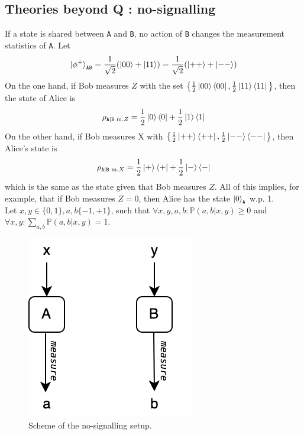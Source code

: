 \documentclass{article}
\begin{document}
\subsection{Theories beyond Q : no-signalling}
If a state is shared between \texttt{A} and \texttt{B}, no action of \texttt{B}
changes the measurement statistics of \texttt{A}. Let
\begin{equation}
    \ket{\phi^+}_{\texttt{AB}}
        = \frac{1}{\sqrt2}(\ket{00} + \ket{11})
        = \frac{1}{\sqrt2}(\ket{++} + \ket{--})
\end{equation}
On the one hand, if Bob measures $Z$ with the set
$\big\{\frac{1}{2}\ket{00}\bra{00},\frac{1}{2}\ket{11}\bra{11} \big\}$, then the
state of Alice is
\begin{equation}
    \rho_{\texttt{A}|\texttt{B}\text{ m.}Z}
        = \frac{1}{2} \ket{0}\bra{0} + \frac{1}{2}\ket{1}\bra{1}
\end{equation}On the other hand, if
Bob measures X with
$\big\{\frac{1}{2}\ket{++}\bra{++},\frac{1}{2}\ket{--}\bra{--} \big\}$, then
Alice's state is
\begin{equation}
    \rho_{\texttt{A}|\texttt{B}\text{ m.}X}
        = \frac{1}{2}\ket{+}\bra{+} + \frac{1}{2}\ket{-}\bra{-}
\end{equation}
which is the same as the state given that Bob measures $Z$. All of this implies,
for example, that if Bob measures $Z = 0$, then Alice has the state
$\ket{0}_\texttt{A}$ w.p. 1. \newline \\\noindent Let $x, y\in \{0,1\}, a,
b\{-1, +1\}$, such that $\forall x, y, a, b : \mathbb{P}(a,b|x,y) \geq 0$ and
$\forall x, y : \sum_{a,b}\mathbb{P}(a,b|x,y) = 1$.
\begin{figure}[h]
    \centering
    \includegraphics[scale=0.4]{no-signalling.png}
    \caption{Scheme of the no-signalling setup.}
\end{figure}
\end{document}
